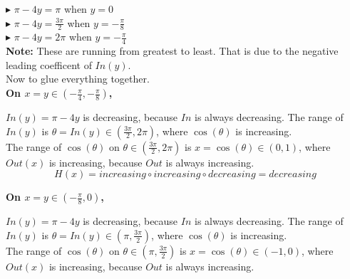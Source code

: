 \documentclass{ximera}
\begin{document}
$\blacktriangleright$ $\pi - 4y = \pi$ when $y = 0$ \\

$\blacktriangleright$ $\pi - 4y = \frac{3\pi}{2}$ when $y = -\frac{\pi}{8}$ \\

$\blacktriangleright$ $\pi - 4y = 2\pi$ when $y = -\frac{\pi}{4}$ \\


\textbf{Note:}  These are running from greatest to least.  That is due to the negative leading coefficent of $In(y)$. \\






Now to glue everything together. \\



\textbf{\textcolor{purple!80!black}{On $x = y \in \left( -\frac{\pi}{4}, -\frac{\pi}{8} \right)$, }}



$In(y) = \pi - 4y$ is decreasing, because $In$ is always decreasing.  The range of $In(y)$ is $\theta = In(y) \in \left(\frac{3\pi}{2}, 2\pi \right)$, where $\cos(\theta)$ is increasing. \\



The range of $\cos(\theta)$ on $\theta \in \left(\frac{3\pi}{2}, 2\pi \right)$ is $x = \cos(\theta) \in (0, 1)$, where $Out(x)$ is increasing, because $Out$ is always increasing. \\


\[
H(x) = increasing \circ increasing \circ decreasing = decreasing
\]











\textbf{\textcolor{purple!80!black}{On $x = y \in \left( -\frac{\pi}{8}, 0 \right)$, }}



$In(y) = \pi - 4y$ is decreasing, because $In$ is always decreasing.  The range of $In(y)$ is $\theta = In(y) \in \left(\pi, \frac{3\pi}{2} \right)$, where $\cos(\theta)$ is increasing. \\



The range of $\cos(\theta)$ on $\theta \in \left(\pi, \frac{3\pi}{2} \right)$ is $x = \cos(\theta) \in (-1, 0)$, where $Out(x)$ is increasing, because $Out$ is always increasing. \\
\end{document}
